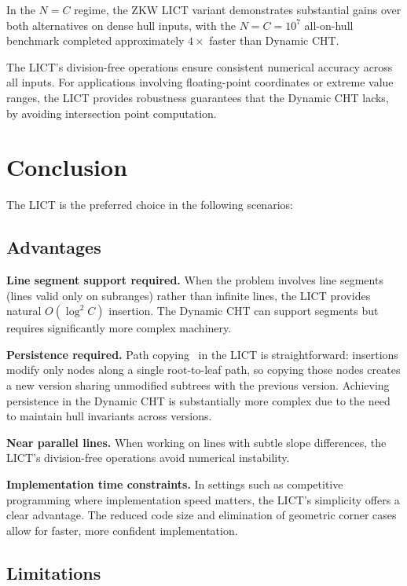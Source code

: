\documentclass[11pt,a4paper]{article}
\theoremstyle{definition}
\theoremstyle{plain}
\begin{document}
In the $N = C$ regime, the ZKW LICT variant demonstrates substantial gains over both alternatives on dense hull inputs, with the $N = C = 10^7$ all-on-hull benchmark completed approximately $4\times$ faster than Dynamic CHT. 

The LICT's division-free operations ensure consistent numerical accuracy across all inputs. For applications involving floating-point coordinates or extreme value ranges, the LICT provides robustness guarantees that the Dynamic CHT lacks, by avoiding intersection point computation.

\section{Conclusion}\label{sec:discussion}

The LICT is the preferred choice in the following scenarios:

\subsection{Advantages}

\textbf{Line segment support required.} When the problem involves line segments (lines valid only on subranges) rather than infinite lines, the LICT provides natural $O(\log^2 C)$ insertion. The Dynamic CHT can support segments but requires significantly more complex machinery.

\textbf{Persistence required.} Path copying~\cite{driscoll1989} in the LICT is straightforward: insertions modify only nodes along a single root-to-leaf path, so copying those nodes creates a new version sharing unmodified subtrees with the previous version. Achieving persistence in the Dynamic CHT is substantially more complex due to the need to maintain hull invariants across versions.

\textbf{Near parallel lines.} When working on lines with subtle slope differences, the LICT's division-free operations avoid numerical instability.

\textbf{Implementation time constraints.} In settings such as competitive programming where implementation speed matters, the LICT's simplicity offers a clear advantage. The reduced code size and elimination of geometric corner cases allow for faster, more confident implementation.

\subsection{Limitations}
\end{document}
